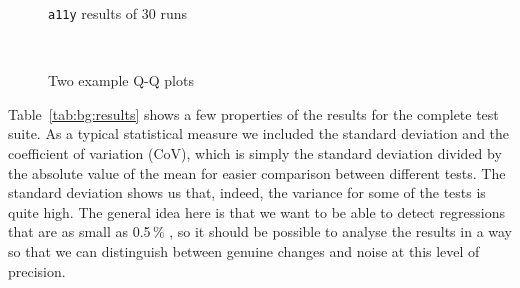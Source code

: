 \begin{figure}[tpb]
    \centering
    
    \caption{\texttt{a11y} results of 30 runs}
    \label{fig:bg:a11y}
\end{figure}

\begin{figure}[tpb]
    \centering
    \\
    \caption{Two example Q-Q plots}
    \label{fig:bg:qqex}
\end{figure}

Table~\ref{tab:bg:results} shows a few properties of the results for the
complete test suite. As a typical statistical measure we included the standard
deviation and the coefficient of variation (CoV), which is simply the standard
deviation divided by the absolute value of the mean for easier comparison
between different tests. The standard deviation shows us that, indeed, the
variance for some of the tests is quite high.
The general idea here is that we want to be able to detect regressions that
are as small as 0.5\,\% \citep{ocallahan_private_2010}, so it should be possible
to analyse the results in a way so that we can distinguish between genuine
changes and noise at this level of precision.

